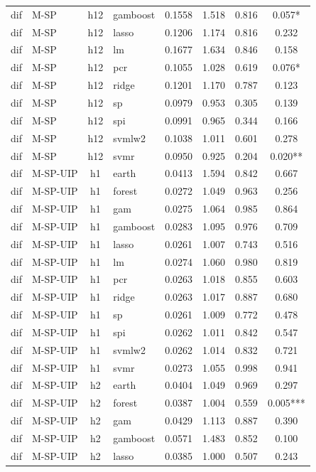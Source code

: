 \begin{ThreePartTable}
\begin{longtable}[t]{llclcccc}
dif & M-SP & h12 & gamboost & 0.1558 & 1.518 & 0.816 & 0.057*\\
dif & M-SP & h12 & lasso & 0.1206 & 1.174 & 0.816 & 0.232\\
dif & M-SP & h12 & lm & 0.1677 & 1.634 & 0.846 & 0.158\\
dif & M-SP & h12 & pcr & 0.1055 & 1.028 & 0.619 & 0.076*\\
dif & M-SP & h12 & ridge & 0.1201 & 1.170 & 0.787 & 0.123\\
dif & M-SP & h12 & sp & 0.0979 & 0.953 & 0.305 & 0.139\\
dif & M-SP & h12 & spi & 0.0991 & 0.965 & 0.344 & 0.166\\
dif & M-SP & h12 & svmlw2 & 0.1038 & 1.011 & 0.601 & 0.278\\
dif & M-SP & h12 & svmr & 0.0950 & 0.925 & 0.204 & 0.020**\\
\addlinespace
dif & M-SP-UIP & h1 & earth & 0.0413 & 1.594 & 0.842 & 0.667\\
dif & M-SP-UIP & h1 & forest & 0.0272 & 1.049 & 0.963 & 0.256\\
dif & M-SP-UIP & h1 & gam & 0.0275 & 1.064 & 0.985 & 0.864\\
dif & M-SP-UIP & h1 & gamboost & 0.0283 & 1.095 & 0.976 & 0.709\\
dif & M-SP-UIP & h1 & lasso & 0.0261 & 1.007 & 0.743 & 0.516\\
dif & M-SP-UIP & h1 & lm & 0.0274 & 1.060 & 0.980 & 0.819\\
dif & M-SP-UIP & h1 & pcr & 0.0263 & 1.018 & 0.855 & 0.603\\
dif & M-SP-UIP & h1 & ridge & 0.0263 & 1.017 & 0.887 & 0.680\\
dif & M-SP-UIP & h1 & sp & 0.0261 & 1.009 & 0.772 & 0.478\\
dif & M-SP-UIP & h1 & spi & 0.0262 & 1.011 & 0.842 & 0.547\\
dif & M-SP-UIP & h1 & svmlw2 & 0.0262 & 1.014 & 0.832 & 0.721\\
dif & M-SP-UIP & h1 & svmr & 0.0273 & 1.055 & 0.998 & 0.941\\
\addlinespace
dif & M-SP-UIP & h2 & earth & 0.0404 & 1.049 & 0.969 & 0.297\\
dif & M-SP-UIP & h2 & forest & 0.0387 & 1.004 & 0.559 & 0.005***\\
dif & M-SP-UIP & h2 & gam & 0.0429 & 1.113 & 0.887 & 0.390\\
dif & M-SP-UIP & h2 & gamboost & 0.0571 & 1.483 & 0.852 & 0.100\\
dif & M-SP-UIP & h2 & lasso & 0.0385 & 1.000 & 0.507 & 0.243\\

\end{longtable}
\end{ThreePartTable}
